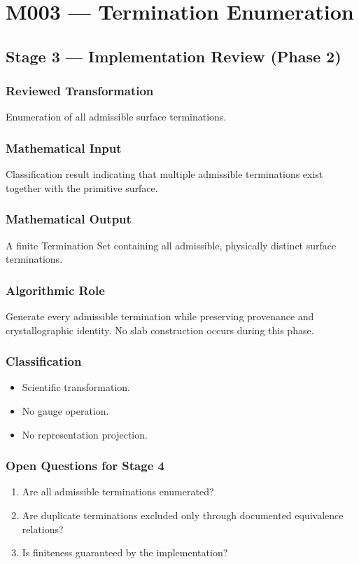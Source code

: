 \chapter{M003 --- Termination Enumeration}

\section{Stage 3 --- Implementation Review (Phase 2)}

\subsection{Reviewed Transformation}

Enumeration of all admissible surface terminations.

\subsection{Mathematical Input}

Classification result indicating that multiple admissible terminations
exist together with the primitive surface.

\subsection{Mathematical Output}

A finite Termination Set containing all admissible, physically distinct
surface terminations.

\subsection{Algorithmic Role}

Generate every admissible termination while preserving provenance and
crystallographic identity. No slab construction occurs during this
phase.

\subsection{Classification}

\begin{itemize}
\item Scientific transformation.
\item No gauge operation.
\item No representation projection.
\end{itemize}

\subsection{Open Questions for Stage 4}

\begin{enumerate}
\item Are all admissible terminations enumerated?
\item Are duplicate terminations excluded only through documented
equivalence relations?
\item Is finiteness guaranteed by the implementation?
\end{enumerate}
